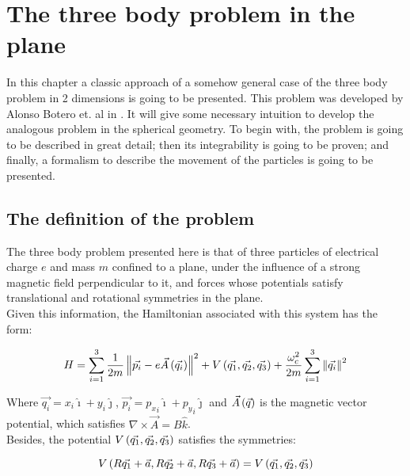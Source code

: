 \chapter{The three body problem in the plane}

In this chapter a classic approach of a somehow general case of the three body problem in 2 dimensions is going to be presented. This problem was developed by Alonso Botero et. al in \cite{alonso}. It will give some necessary intuition to develop the analogous problem in the spherical geometry. To begin with, the problem is going to be described in great detail; then its integrability is going to be proven; and finally, a formalism to describe the movement of the particles is going to be presented.\\

\section{The definition of the problem}

The three body problem presented here is that of three particles of electrical charge $e$ and mass $m$ confined to a plane, under the influence of a strong magnetic field perpendicular to it, and forces whose potentials satisfy translational and rotational symmetries in the plane.\\

Given this information, the Hamiltonian associated with this system has the form:

\begin{equation}
H = \sum_{i=1}^{3} \frac{1}{2m} \left\lVert  \vec{p_i} - 
e\vec{ A } \left( \vec{q_i} \right) \right\rVert^2
+ V \left(  \vec{q_1},\vec{q_2},\vec{q_3}  \right)
+\frac{\omega_c^2}{2m}\sum_{i=1}^{3} \left\lVert \vec{q_i} \right\rVert^2
\label{eq:ham2d}
\end{equation}

Where $\vec{q_i} = x_i \hat{\imath} + y_i \hat{\jmath}$, $\vec{p_i} = {p_x}_i\hat{\imath} + {p_y}_i\hat{\jmath}$ and $\vec{A}\left( \vec{q} \right)$ is the magnetic vector potential, which satisfies $\nabla \times \vec{A} = B\hat{k}$.\\

Besides, the potential $V \left(  \vec{q_1},\vec{q_2},\vec{q_3}  \right)$ satisfies the symmetries:

\begin{equation}
V \left(  R\vec{q_1}+\vec{a},R\vec{q_2}+\vec{a},R\vec{q_3}+\vec{a}   \right)= V \left(  \vec{q_1},\vec{q_2},\vec{q_3}  \right)
\label{eq:vsym}
\end{equation}

